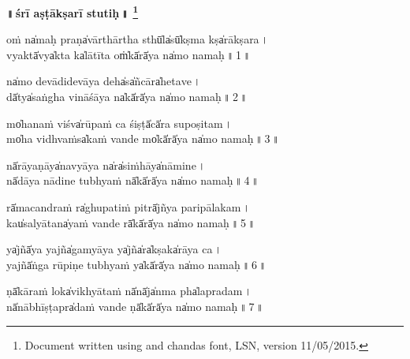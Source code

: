 \documentclass[parskip, DIV=18]{scrartcl}
\renewcommand{\thefootnote}{\fnsymbol{footnote}} %
\begin{document}

\vspace{-1.5cm}

\begin{center}
\textbf{{\Huge ॥\,śrī a॒ṣṭākṣarī stutiḥ॒\,॥} \LARGE\let\thefootnote\relax\footnote{ \color{lightgray} Document written using \XeLaTeX{} and chandas font, LSN, version 11/05/2015.}}
\end{center}
\Large

\centering

\vspace{-0.5cm}

oṁ na̍maḥ praṇa̍vārthā॒rtha sthū̍la̍sū̍kṣma kṣa̍rākṣa॒ra॒\,। \\
vya॒ktā̍vya̍kta ka̍lātī॒ta oṁ̍kā̍rā̍ya na̍mo na॒ma॒ḥ॒\,॥\,1\,॥  

\vspace{0.3cm}

\noindent na̍mo devādi॑devā॒ya de॑ha̍sa̍ñcāra̍heta॒ve॒\,। \\
dā̍tya̍saṅgha vi॑nāśā॒ya na̍kā̍rā̍ya na̍mo na॒ma॒ḥ॒\,॥\,2\,॥ 

\vspace{0.3cm}

\noindent mo̍hanaṁ viśva̍rūpa॒ṁ ca śi॒ṣṭā̍cā̍ra su॑poṣi॒ta॒m\,। \\
mo̍ha vidhvaṁsa̍kaṁ va॒nde mo̍kā̍rā̍ya na̍mo na॒ma॒ḥ॒\,॥\,3\,॥ 

\vspace{0.3cm}

\noindent nā̍rāyaṇāya̍navyā॒ya na̍ra̍si॑ṁhāya̍nāmi॒ne॒\,। \\
nā̍dāya nādi॑ne tu॒bhyaṁ nā̍kā̍rā̍ya na̍mo na॒ma॒ḥ॒\,॥\,4\,॥ 

\vspace{0.3cm}

\noindent rā̍macandraṁ ra̍ghupa॒tiṁ pi॒trā̍jñya pari॑pāla॒ka॒m\,। \\
kau̍salyātana̍yaṁ va॒nde rā̍kā̍rā̍ya na̍mo na॒ma॒ḥ॒\,॥\,5\,॥ 

\vspace{0.3cm}

\noindent ya̍jñā̍ya yajña̍gamyā॒ya ya̍jña̍ra̍kṣaka̍rāya॒ ca॒\,। \\
ya॒jñā̍ṅga rūpi॑ṇe tu॒bhyaṁ ya̍kā̍rā̍ya na̍mo na॒ma॒ḥ॒\,॥\,6\,॥ 

\vspace{0.3cm}

\noindent ṇā̍kāraṁ loka̍vikhyā॒taṁ nā̍nā̍ja̍nma pha̍lapra॒da॒m\,। \\
nā̍nābhīṣṭapra̍daṁ va॒nde ṇā̍kā̍rā̍ya na̍mo na॒ma॒ḥ॒\,॥\,7\,॥ 
\end{document}

